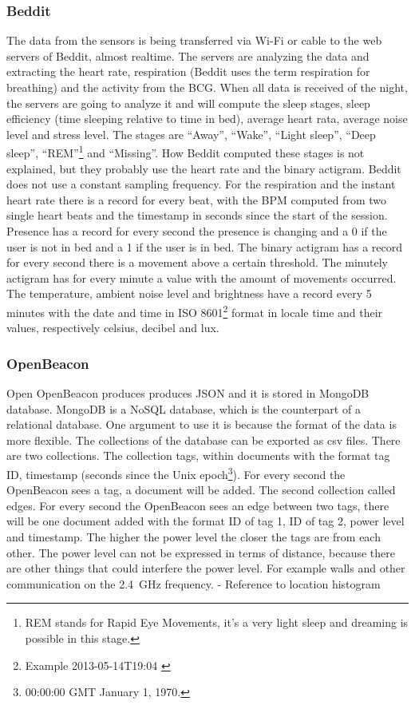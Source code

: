 		\subsubsection{Beddit}
		\label{sec:datadescriptionbeddit}
		The data from the sensors is being transferred via Wi-Fi or cable to the web servers of Beddit, almost realtime. The servers are analyzing the data and extracting the heart rate, respiration (Beddit uses the term respiration for breathing) and the activity from the BCG. When all data is received of the night, the servers are going to analyze it and will compute the sleep stages, sleep efficiency (time sleeping relative to time in bed), average heart rata, average noise level and stress level. The stages are ``Away'', ``Wake'', ``Light sleep'', ``Deep sleep'', ``REM''\footnote{REM stands for Rapid Eye Movements, it's a very light sleep and dreaming is possible in this stage.} and ``Missing''. How Beddit computed these stages is not explained, but they probably use the heart rate and the binary actigram. Beddit does not use a constant sampling frequency. For the respiration and the instant heart rate there is a record for every beat, with the BPM computed from two single heart beats and the timestamp in seconds since the start of the session. Presence has a record for every second the presence is changing and a 0 if the user is not in bed and a 1 if the user is in bed. The binary actigram has a record for every second there is a movement above a certain threshold. The minutely actigram has for every minute a value with the amount of movements occurred. The temperature, ambient noise level and brightness have a record every 5 minutes with the date and time in ISO 8601\footnote{Example 2013-05-14T19:04 \cite{iso8601}} format in locale time and their values, respectively celsius, decibel and lux.

		\subsubsection{OpenBeacon}
			Open OpenBeacon produces produces JSON and it is stored in MongoDB database. MongoDB is a NoSQL database, which is the counterpart of a relational database. One argument to use it is because the format of the data is more flexible. The collections of the database can be exported as csv files.
			There are two collections. The collection tags, within documents with the format tag ID, timestamp (seconds since the Unix epoch\footnote{00:00:00 GMT January 1, 1970.}). For every second the OpenBeacon sees a tag, a document will be added.
			The second collection called edges. For every second the OpenBeacon sees an edge between two tags, there will be one document added with the format ID of tag 1, ID of tag 2, power level and timestamp.
			The higher the power level the closer the tags are from each other. The power level can not be expressed in terms of distance, because there are other things that could interfere the power level. For example walls and other communication on the \SI{2.4}{\giga\hertz} frequency. - Reference to location histogram
